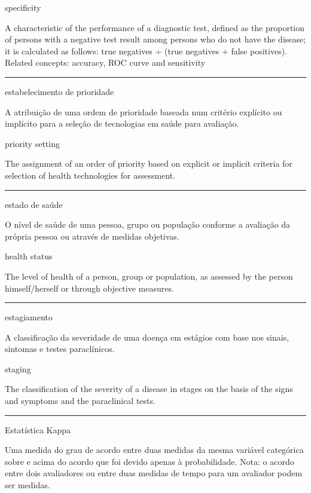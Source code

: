 \documentclass[
  openany]{book}
\begin{document}
specificity

A characteristic of the performance of a diagnostic test, defined as the proportion of persons with a negative test result among persons who do not have the disease; it is calculated as follows: true negatives ÷ (true negatives + false positives). Related concepts: accuracy, ROC curve and sensitivity

\begin{center}\rule{0.5\linewidth}{0.5pt}\end{center}

estabelecimento de prioridade

A atribuição de uma ordem de prioridade baseada num critério explícito ou implícito para a seleção de tecnologias em saúde para avaliação.

priority setting

The assignment of an order of priority based on explicit or implicit criteria for selection of health technologies for assessment.

\begin{center}\rule{0.5\linewidth}{0.5pt}\end{center}

estado de saúde

O nível de saúde de uma pessoa, grupo ou população conforme a avaliação da própria pessoa ou através de medidas objetivas.

health status

The level of health of a person, group or population, as assessed by the person himself/herself or through objective measures.

\begin{center}\rule{0.5\linewidth}{0.5pt}\end{center}

estagiamento

A classificação da severidade de uma doença em estágios com base nos sinais, sintomas e testes paraclínicos.

staging

The classification of the severity of a disease in stages on the basis of the signs and symptoms and the paraclinical tests.

\begin{center}\rule{0.5\linewidth}{0.5pt}\end{center}

Estatística Kappa

Uma medida do grau de acordo entre duas medidas da mesma variável categórica sobre e acima do acordo que foi devido apenas à probabilidade. Nota: o acordo entre dois avaliadores ou entre duas medidas de tempo para um avaliador podem ser medidas.
\end{document}
